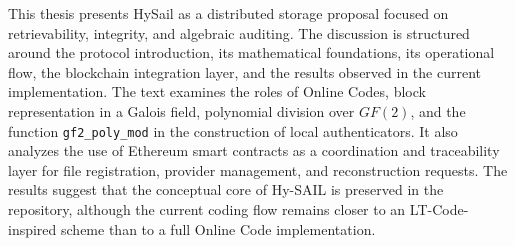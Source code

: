 This thesis presents HySail as a distributed storage proposal focused on retrievability, integrity, and algebraic auditing. The discussion is structured around the protocol introduction, its mathematical foundations, its operational flow, the blockchain integration layer, and the results observed in the current implementation. The text examines the roles of Online Codes, block representation in a Galois field, polynomial division over $GF(2)$, and the function \texttt{gf2\_poly\_mod} in the construction of local authenticators. It also analyzes the use of Ethereum smart contracts as a coordination and traceability layer for file registration, provider management, and reconstruction requests. The results suggest that the conceptual core of Hy-SAIL is preserved in the repository, although the current coding flow remains closer to an LT-Code-inspired scheme than to a full Online Code implementation.

